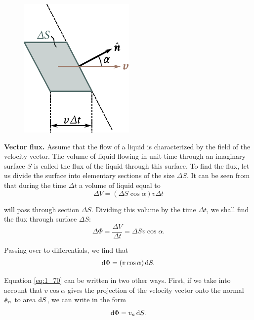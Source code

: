 \begin{figure}[t]
	\begin{center}
		\includegraphics[scale=1]{figures/ch_01/fig_1_19.pdf}
		\caption[]{}
		\label{fig:1_19}
	\end{center}
	\vspace{-0.8cm}
\end{figure}

\textbf{Vector flux.} Assume that the flow of a liquid is characterized by the field of the velocity vector. The volume of liquid flowing in unit time through an imaginary surface $S$ is called the flux of the liquid through this surface. To find the flux, let us divide the surface into elementary sections of the size $\Delta{S}$. It can be seen from  that during the time $\Delta{t}$ a volume of liquid equal to
\begin{equation*}
	\Delta{V} = (\Delta{S}\cos\alpha) v\Delta{t}
\end{equation*}

\noindent
will pass through section $\Delta{S}$. Dividing this volume by the time $\Delta{t}$, we shall find the flux through surface $\Delta{S}$:
\begin{equation*}
	\Delta{\Phi} = \frac{\Delta{V}}{\Delta{t}} = \Delta{S} v \cos\alpha.
\end{equation*}

\noindent
Passing over to differentials, we find that
\begin{equation}\label{eq:1_70}
	\mathrm{d}\Phi = (v \cos\alpha)\, \mathrm{d} S.
\end{equation}

\noindent
Equation \eqref{eq:1_70} can be written in two other ways. First, if we take into account that $v\cos\alpha$ gives the projection of the velocity vector onto the normal $\hat{\boldsymbol{e}}_{n}$ to area $\mathrm{d} S$, we can write  in the form
\begin{equation}\label{eq:1_71}
	\mathrm{d}\Phi = v_n\, \mathrm{d} S.
\end{equation}

